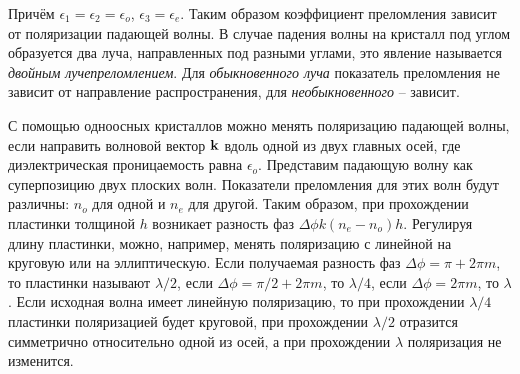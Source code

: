 \noindent
Причём $\epsilon_1 = \epsilon_2 = \epsilon_o$, $\epsilon_3 = \epsilon_e$. Таким образом коэффициент преломления зависит от поляризации падающей волны. В случае падения волны на кристалл под углом образуется два луча, направленных под разными углами, это явление называется \textit{двойным лучепреломлением}. Для \textit{обыкновенного луча} показатель преломления не зависит от направление распространения, для \textit{необыкновенного} -- зависит.

С помощью одноосных кристаллов можно менять поляризацию падающей волны, если направить волновой вектор $\mathbf k$ вдоль одной из двух главных осей, где диэлектрическая проницаемость равна $\epsilon_o$. Представим падающую волну как суперпозицию двух плоских волн. Показатели преломления для этих волн будут различны: $n_o$ для одной и $n_e$ для другой. Таким образом, при прохождении пластинки толщиной $h$ возникает разность фаз $\Delta \phi k \left( n_e - n_o \right) h$. Регулируя длину пластинки, можно, например, менять поляризацию с линейной на круговую или на эллиптическую. Если получаемая разность фаз $\Delta \phi = \pi + 2 \pi m$, то пластинки называют $\lambda / 2$, если $\Delta \phi = \pi / 2 + 2 \pi m$, то $\lambda / 4$, если $\Delta \phi = 2 \pi m$, то $\lambda$. Если исходная волна имеет линейную поляризацию, то при прохождении $\lambda / 4$ пластинки поляризацией будет круговой, при прохождении $\lambda / 2$ отразится симметрично относительно одной из осей, а при прохождении $\lambda$ поляризация не изменится.